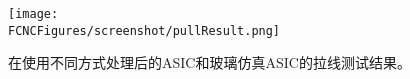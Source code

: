\begin{figure}[H]
\centering
\texttt{[image: \\FCNCFigures/screenshot/pullResult.png]}
\caption{在使用不同方式处理后的ASIC和玻璃仿真ASIC的拉线测试结果。}
\label{fig:pullResult}
\end{figure}